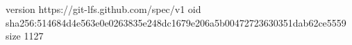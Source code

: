 version https://git-lfs.github.com/spec/v1
oid sha256:514684d4e563e0e0263835e248dc1679e206a5b00472723630351dab62ce5559
size 1127
